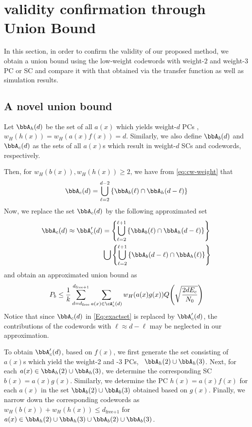 \section{validity confirmation through Union Bound}
\label{sec4}
 In this section, in order to confirm the validity of our proposed method, we obtain a union bound using the low-weight codewords with weight-$2$ and weight-$3$ PC or SC and compare it with that obtained via the transfer function as well as simulation results.

\subsection{A novel union bound}
Let $\bbA_h(d)$ be the set of all $a(x)$ which yields weight-$d$ PCs \ie, $w_H(h(x))=w_H(a(x)f(x))=d$. Similarly, we also define $\bbA_b(d)$ and $\bbA_c(d)$ as the sets of all $a(x)$s which result in weight-$d$ SCs and codewords, respectively.

Then, for $w_H(b(x)), w_H(h(x)) \geq 2$, we have from \eqref{eq:cw-weight} that
\begin{align}
\bbA_c(d) = \bigcup_{\ell = 2}^{d-2} \left\{\bbA_b(\ell) \cap \bbA_h(d-\ell)\right\}
\label{Eq:exactset}
\end{align}
Now, we replace the set $\bbA_c(d)$ by the following approximated set %
\begin{equation}
\begin{split}
\bbA_c(d) \approx \bbA_c'(d) &= \left\{\bigcup_{\ell = 2}^{\ell+1} \left\{\bbA_b(\ell) \cap \bbA_h(d-\ell)\right\}\right\} \\ 
&\bigcup \left\{\bigcup_{\ell = 2}^{\ell+1} \left\{\bbA_b(d-\ell) \cap \bbA_h(\ell)\right\}\right\}
\end{split}
\label{setApprox}
\end{equation}
and obtain an approximated union bound as
\begin{align}
P_b \leq \frac{1}{k} \sum_{d=d_{\text{free}}}^{d_{\text{free}+1}} \sum_{a(x) \in \cA'_c(d)}w_H(a(x)g(x)) Q\Bigg( \sqrt{\frac{2dE_c}{N_0}}\Bigg)
\label{novelEq7}
\end{align}
Notice that since $\bbA_c(d)$ in \eqref{Eq:exactset} is replaced by $\bbA_c'(d)$, the contributions of the codewords with $\ell \approx d-\ell$ may be neglected in our approximation.

To obtain $\bbA_c'(d)$, based on $f(x)$, we first generate the set consisting of $a(x)$s which yield the weight-2 and -3 PCs, \ie~$\bbA_h(2)\cup\bbA_h(3)$. Next, for each $a(x) \in \bbA_h(2)\cup\bbA_h(3)$, we determine the corresponding SC $b(x)=a(x)g(x)$. Similarly, we determine the PC $h(x)=a(x)f(x)$ for each $a(x)$ in the set $\bbA_b(2)\cup\bbA_b(3)$  obtained based on $g(x)$. Finally, we narrow down the corresponding codewords as $w_H(b(x))+w_H(h(x)) \leq d_{\text{free+1}}$ for $a(x) \in \bbA_h(2)\cup\bbA_h(3)\cup\bbA_b(2)\cup\bbA_b(3)$.


